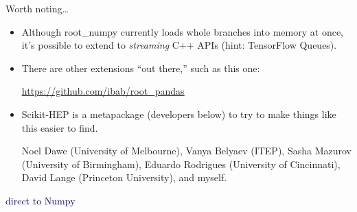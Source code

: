 \documentclass{beamer}
\begin{document}
\begin{frame}{Worth noting\ldots}
\vspace{0.25 cm}
\begin{itemize}\setlength{\itemsep}{0.5 cm}
\item Although root\_numpy currently loads whole branches into memory at once, it's possible to extend to {\it streaming} C++ APIs (hint: TensorFlow Queues).

\item There are other extensions ``out there,'' such as this one:
\begin{center}
\textcolor{blue}{\underline{\url{https://github.com/ibab/root_pandas}}}
\end{center}

\item Scikit-HEP is a metapackage (developers below) to try to make things like this easier to find.

\footnotesize
\vspace{0.25 cm}
Noel Dawe (University of Melbourne), Vanya Belyaev (ITEP), Sasha Mazurov (University of Birmingham), Eduardo Rodrigues (University of Cincinnati), David Lange (Princeton University), and myself.
\end{itemize}
\end{frame}

\begin{frame}{}
\begin{center}
\LARGE \textcolor{darkblue}{direct to Numpy}
\end{center}
\end{frame}
\end{document}
